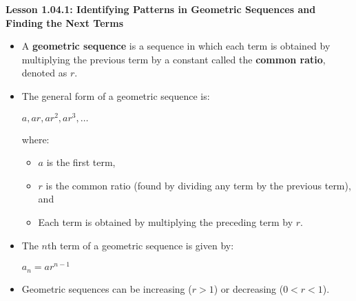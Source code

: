 \begin{center}
\textbf{Lesson 1.04.1: Identifying Patterns in Geometric Sequences and Finding the Next Terms}
\end{center}

\vspace*{-1.5ex}

\begin{itemize}
    \item A \textbf{geometric sequence} is a sequence in which each term is obtained by multiplying the previous term by a constant called the \textbf{common ratio}, denoted as $r$.
    \item The general form of a geometric sequence is:

{\centering $  a, ar, ar^2, ar^3, \dots  $\par}
\noindent     where:
    \begin{itemize}
        \item $a$ is the first term,
        \item $r$ is the common ratio (found by dividing any term by the previous term), and
        \item Each term is obtained by multiplying the preceding term by $r$.
    \end{itemize}
    \item The $n$th term of a geometric sequence is given by:

{\centering $  a_n = a r^{n-1}  $\par}
    \item Geometric sequences can be increasing ($r > 1$) or decreasing ($0 < r < 1$).
\end{itemize}
